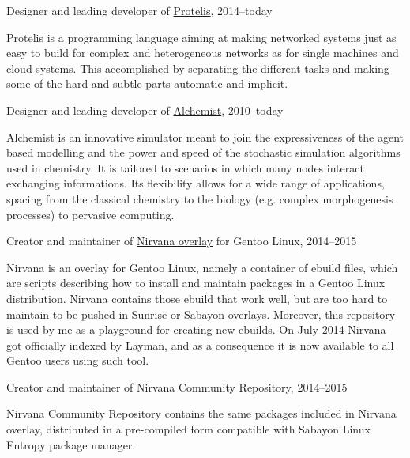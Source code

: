 \documentclass[10pt]{article}
\newenvironment{innerlist}[1][\enskip\textbullet]%
        {\begin{compactitem}[#1]}{\end{compactitem}}
\newcommand{\halfblankline}{\quad\vspace{-0.5\baselineskip}\pagebreak[3]}
\begin{document}
Designer and leading developer of \href{http://protelis.org/}{Protelis}, 2014--today
\begin{innerlist}
    \item Protelis is a programming language aiming at making networked systems just as easy to build for complex and heterogeneous networks as for single machines and cloud systems. This accomplished by separating the different tasks and making some of the hard and subtle parts automatic and implicit.
\end{innerlist}
\halfblankline

Designer and leading developer of \href{http://alchemist.apice.unibo.it/}{Alchemist}, 2010--today
\begin{innerlist}
    \item Alchemist is an innovative simulator meant to join the expressiveness of the agent based modelling and the power and speed of the stochastic simulation algorithms used in chemistry. It is tailored to scenarios in which many nodes interact exchanging  informations. Its flexibility allows for a wide range of applications, spacing from the classical chemistry to the biology (e.g. complex morphogenesis processes) to pervasive computing.
\end{innerlist}
\halfblankline

Creator and maintainer of \href{https://bitbucket.org/danysk/nirvana-overlay/}{Nirvana overlay} for Gentoo Linux, 2014--2015
\begin{innerlist}
    \item Nirvana is an overlay for Gentoo Linux, namely a container of ebuild files, which are scripts describing how to install and maintain packages in a Gentoo Linux distribution. Nirvana contains those ebuild that work well, but are too hard to maintain to be pushed in Sunrise or Sabayon overlays. Moreover, this repository is used by me as a playground for creating new ebuilds. On July 2014 Nirvana got officially indexed by Layman, and as a consequence it is now available to all Gentoo users using such tool.
\end{innerlist}
\halfblankline

Creator and maintainer of {Nirvana Community Repository}, 2014--2015
\begin{innerlist}
    \item Nirvana Community Repository contains the same packages included in Nirvana overlay, distributed in a pre-compiled form compatible with Sabayon Linux Entropy package manager.
\end{innerlist}
\halfblankline
\end{document}
